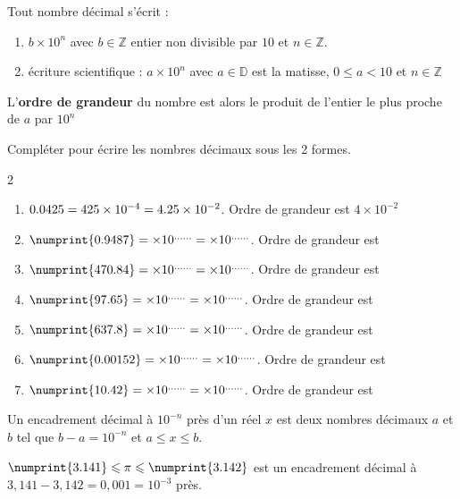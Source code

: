 \documentclass[main.tex]{subfiles}
\begin{document}
\begin{eBox} Tout nombre décimal s'écrit : 
	\begin{enumerate}[label=\textbullet]
		\item $b \times 10^n$ avec  $b\in\mathbb{Z}$ entier non divisible par $10$ et $n\in\mathbb{Z}$.
		\item écriture scientifique : $a \times 10^n$ avec  $a\in\mathbb{D}$ est la matisse, $0\leqslant a<10$ et  $n\in\mathbb{Z}$ 
	\end{enumerate}  
	L'\textbf{ordre de grandeur} du nombre est alors le produit de l'entier le plus proche de $a$ par $10^n$
\end{eBox}  
\begin{exercise} Compléter pour écrire les nombres décimaux sous les 2 formes.
	\vspace{-0.75em}
\begin{spacing}{2}
\begin{enumerate}[leftmargin=*,label=\arabic*)]
	\item $0.0425=\dotfill 425\times 10^{-4}=\dotfill 4.25\times 10^{-2}$. Ordre de grandeur est \dotfill$4\times 10^{-2}$
	\item $\numprint{0.9487} = \dotfill \times 10^{\ldots\ldots}=\dotfill \times 10^{\ldots\ldots}$. Ordre de grandeur est \dotfill 
	\item $\numprint{470.84} = \dotfill \times 10^{\ldots\ldots}=\dotfill \times 10^{\ldots\ldots}$. Ordre de grandeur est \dotfill 
	\item $\numprint{97.65} = \dotfill \times 10^{\ldots\ldots}=\dotfill \times 10^{\ldots\ldots}$. Ordre de grandeur est \dotfill 
	\item $\numprint{637.8} = \dotfill \times 10^{\ldots\ldots}=\dotfill \times 10^{\ldots\ldots}$. Ordre de grandeur est \dotfill 
	\item $\numprint{0.00152} = \dotfill \times 10^{\ldots\ldots}=\dotfill \times 10^{\ldots\ldots}$. Ordre de grandeur est \dotfill 
	\item $\numprint{10.42} = \dotfill \times 10^{\ldots\ldots}=\dotfill \times 10^{\ldots\ldots}$. Ordre de grandeur est \dotfill  
\end{enumerate}
\end{spacing}
	\vspace{-1em} 
\end{exercise}
\begin{definition}
	Un encadrement décimal à $10^{-n}$ près d'un réel $x$ est deux nombres décimaux $a$ et $b$ tel que $b-a= 10^{-n}$ et $a\leqslant x \leqslant b$. 
\end{definition}
\begin{example} $\numprint{3.141}\leqslant \pi \leqslant \numprint{3.142}$ est un encadrement décimal  à $3,141-3,142=0,001=10^{-3}$ près.
\end{example}
\end{document}
